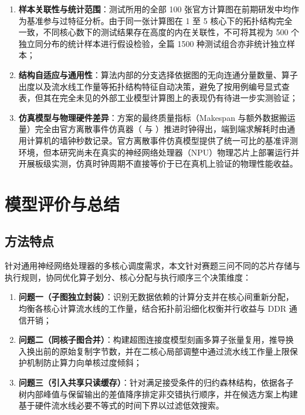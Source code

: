 \documentclass[anonymous,withtoc]{gmcm2026}
\providecommand{\tightlist}{\setlength{\itemsep}{0pt}\setlength{\parskip}{0pt}}
\begin{document}
\begin{enumerate}
\def\labelenumi{\arabic{enumi}.}
\tightlist
\item
  \textbf{样本关联性与统计范围}：测试所用的全部 100 张官方计算图在前期研发中均作为基准参与过特征分析。由于同一张计算图在 1 至 5 核心下的拓扑结构完全一致，不同核心数下的测试结果存在高度的内在关联性，不可将其视为 500 个独立同分布的统计样本进行假设检验，全篇 1500 种测试组合亦非统计独立样本；
\item
  \textbf{结构自适应与通用性}：算法内部的分支选择依据图的无向连通分量数量、算子出度以及流水线工作量等拓扑结构特征自动决策，避免了按用例编号显式查表，但其在完全未见的外部工业模型计算图上的表现仍有待进一步实测验证；
\item
  \textbf{仿真模型与物理硬件差异}：方案的最终质量指标（Makespan 与额外数据搬运量）完全由官方离散事件仿真器（\texttt{} 与 \texttt{}）推进时钟得出，端到端求解耗时由通用计算机的墙钟秒数记录。官方离散事件仿真模型提供了统一可比的基准评测环境，但本研究尚未在真实的神经网络处理器（NPU）物理芯片上部署运行并开展板级实测，仿真时钟周期不直接等价于已在真机上验证的物理性能收益。
\end{enumerate}


\section{模型评价与总结}

\subsection{方法特点}

针对通用神经网络处理器的多核心调度需求，本文针对赛题三问不同的芯片存储与执行规则，协同优化算子划分、核心分配与执行顺序三个决策维度：

\begin{enumerate}
\def\labelenumi{\arabic{enumi}.}
\tightlist
\item
  \textbf{问题一（子图独立封装）}：识别无数据依赖的计算分支并在核心间重新分配，均衡各核心计算流水线的工作量，结合拓扑前沿细化权衡并行收益与 DDR 通信开销；
\item
  \textbf{问题二（同核子图合并）}：构建超图连接度模型刻画多算子张量复用，推导换入换出前的原始复制字节数，并在二核心局部调整中通过流水线工作量上限保护机制防止算力向单核过度倾斜；
\item
  \textbf{问题三（引入共享只读缓存）}：针对满足接受条件的归约森林结构，依据各子树内部峰值与保留输出的差值降序排定非交错执行顺序，并在候选方案上构建基于硬件流水线必要不等式的时间下界以过滤低效搜索。
\end{enumerate}
\end{document}
